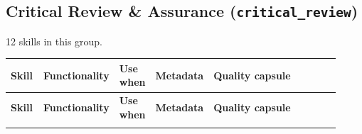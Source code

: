 \documentclass[
]{article}
\renewcommand{\arraystretch}{1.08}
\begin{document}
\subsection{\texorpdfstring{Critical Review \& Assurance
(\texttt{critical\_review})}{Critical Review & Assurance (critical_review)}}\label{critical-review-assurance-critical_review}

12 skills in this group.

\begingroup
\scriptsize
\setlength{\tabcolsep}{1.8pt}
\renewcommand{\arraystretch}{1.02}
\begin{longtable}{@{}>{\raggedright\arraybackslash}p{0.105\linewidth}>{\raggedright\arraybackslash}p{0.13\linewidth}>{\raggedright\arraybackslash}p{0.095\linewidth}>{\raggedright\arraybackslash}p{0.135\linewidth}>{\raggedright\arraybackslash}p{0.455\linewidth}@{}}
\toprule
\textbf{Skill} & \textbf{Functionality} & \textbf{Use when} & \textbf{Metadata} & \textbf{Quality capsule}\\
\midrule
\endfirsthead
\toprule
\textbf{Skill} & \textbf{Functionality} & \textbf{Use when} & \textbf{Metadata} & \textbf{Quality capsule}\\
\midrule
\endhead
\bottomrule
\endfoot

\end{longtable}
\end{document}
